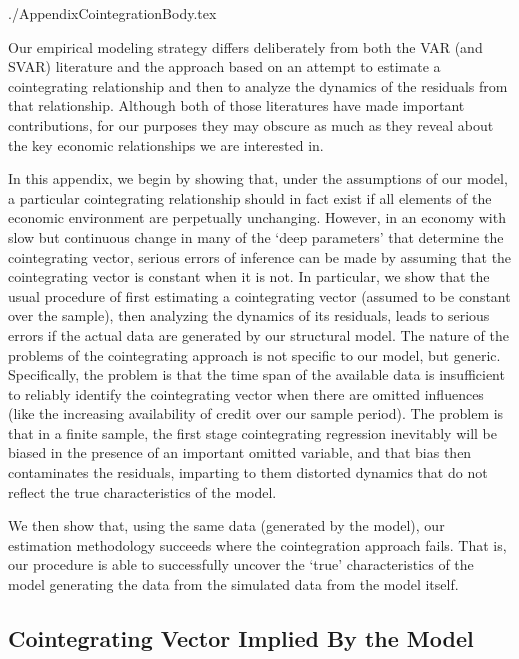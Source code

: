 \documentclass{\econtex}
\begin{document}


\begin{verbatimwrite}{./AppendixCointegrationBody.tex}

Our empirical modeling strategy differs deliberately from both the VAR
(and SVAR) literature and the approach based on an attempt to estimate 
a cointegrating relationship and then to analyze the dynamics of the residuals
from that relationship.  Although both of those literatures have made important
contributions, for our purposes they may obscure as much as they reveal 
about the key economic relationships we are interested in.

In this appendix, we begin by showing that, under the assumptions of our model,
a particular cointegrating relationship should in fact exist if all elements of 
the economic environment are perpetually unchanging.  However, in an economy 
with slow but continuous change in many of the `deep parameters' that determine
the cointegrating vector, serious errors of inference can be made by assuming that
the cointegrating vector is constant when it is not.  In particular, we show that
the usual procedure of first estimating a cointegrating vector (assumed to be constant 
over the sample), then analyzing the dynamics of its residuals, leads to serious errors
if the actual data are generated by our structural model.  The nature of the problems
of the cointegrating approach is not specific to our model, but generic.  Specifically,
the problem is that the time span of the available data is insufficient to reliably 
identify the cointegrating vector when there are omitted influences (like the 
increasing availability of credit over our sample period).  The problem is that in a 
finite sample, the first stage cointegrating regression inevitably will be biased 
in the presence of an important omitted variable, and that bias then contaminates
the residuals, imparting to them distorted dynamics that do not reflect the true
characteristics of the model.

We then show that, using the same data (generated by the model), our estimation methodology 
succeeds where the cointegration approach fails.  That is, our procedure is able to 
successfully uncover the `true' characteristics of the model generating the data 
from the simulated data from the model itself.  

\subsection{Cointegrating Vector Implied By the Model}


\end{verbatimwrite}
\end{document}
